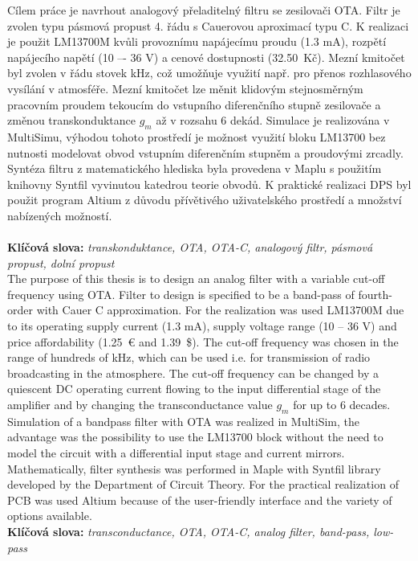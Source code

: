 \noindent Cílem práce je navrhout analogový přeladitelný filtru se zesilovači OTA. Filtr je zvolen typu pásmová propust 4. řádu s Cauerovou aproximací typu C. K realizaci je použit LM13700M kvůli provoznímu napájecímu proudu (1.3 mA), rozpětí napájecího napětí (10 –- 36 V) a cenové dostupnosti (32.50\ Kč). Mezní kmitočet byl zvolen v řádu stovek kHz, což umožňuje využití např. pro přenos rozhlasového vysílání v atmosféře. Mezní kmitočet lze měnit klidovým stejnosměrným pracovním proudem tekoucím do vstupního diferenčního stupně zesilovače a změnou transkonduktance $g_m$ až v rozsahu 6 dekád. Simulace je realizována v MultiSimu, výhodou tohoto prostředí je možnost využití bloku LM13700 bez nutnosti modelovat obvod vstupním diferenčním stupněm a proudovými zrcadly. Syntéza filtru z matematického hlediska byla provedena v Maplu s použitím knihovny Syntfil vyvinutou katedrou teorie obvodů. K praktické realizaci DPS byl použit program Altium z důvodu přívětivého uživatelského prostředí a množství nabízených možností. \\
\\
\noindent \textbf{Klíčová slova:} \textit{transkonduktance, OTA, OTA-C, analogový filtr, pásmová propust, dolní propust}\\

\noindent The purpose of this thesis is to design an analog filter with a variable cut-off frequency using OTA. Filter to design is specified to be a band-pass of fourth-order with Cauer C approximation. For the realization was used LM13700M due to its operating supply current (1.3 mA), supply voltage range (10 -- 36 V) and price affordability (1.25\ \euro{} and 1.39\ \$). The cut-off frequency was chosen in the range of hundreds of kHz, which can be used i.e. for transmission of radio broadcasting in the atmosphere. The cut-off frequency can be changed by a quiescent DC operating current flowing to the input differential stage of the amplifier and by changing the transconductance value $g_m$ for up to 6 decades. Simulation of a bandpass filter with OTA was realized in MultiSim, the advantage was the possibility to use the LM13700 block without the need to model the circuit with a differential input stage and current mirrors. Mathematically, filter synthesis was performed in Maple with Syntfil library developed by the Department of Circuit Theory. For the practical realization of PCB was used Altium because of the user-friendly interface and the variety of options available. \\

\noindent \textbf{Klíčová slova:} \textit{transconductance, OTA, OTA-C, analog filter, band-pass, low-pass} \\